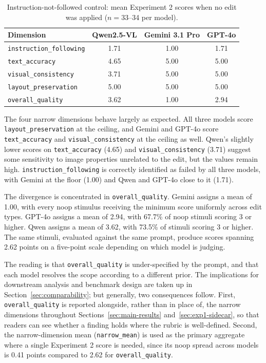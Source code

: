 \begin{table}[htbp]
\centering
\caption{Instruction-not-followed control: mean Experiment 2 scores when no edit was applied ($n = 33$--34 per model).}
\label{tab:noop-control}
\begin{tabular}{lccc}
\toprule
Dimension & Qwen2.5-VL & Gemini 3.1 Pro & GPT-4o \\
\midrule
\texttt{instruction\_following} & 1.71 & 1.00 & 1.71 \\
\texttt{text\_accuracy}         & 4.65 & 5.00 & 5.00 \\
\texttt{visual\_consistency}    & 3.71 & 5.00 & 5.00 \\
\texttt{layout\_preservation}   & 5.00 & 5.00 & 5.00 \\
\texttt{overall\_quality}       & 3.62 & 1.00 & 2.94 \\
\bottomrule
\end{tabular}
\end{table}

The four narrow dimensions behave largely as expected. All three models score \texttt{layout\_preservation} at the ceiling, and Gemini and GPT-4o score \texttt{text\_accuracy} and \texttt{visual\_consistency} at the ceiling as well. Qwen's slightly lower scores on \texttt{text\_accuracy} (4.65) and \texttt{visual\_consistency} (3.71) suggest some sensitivity to image properties unrelated to the edit, but the values remain high. \texttt{instruction\_following} is correctly identified as failed by all three models, with Gemini at the floor (1.00) and Qwen and GPT-4o close to it (1.71).

The divergence is concentrated in \texttt{overall\_quality}. Gemini assigns a mean of 1.00, with every noop stimulus receiving the minimum score uniformly across edit types. GPT-4o assigns a mean of 2.94, with 67.7\% of noop stimuli scoring 3 or higher. Qwen assigns a mean of 3.62, with 73.5\% of stimuli scoring 3 or higher. The same stimuli, evaluated against the same prompt, produce scores spanning 2.62 points on a five-point scale depending on which model is judging.

The reading is that \texttt{overall\_quality} is under-specified by the prompt, and that each model resolves the scope according to a different prior. The implications for downstream analysis and benchmark design are taken up in Section~\ref{sec:comparability}; but generally, two consequences follow. First, \texttt{overall\_quality} is reported alongside, rather than in place of, the narrow dimensions throughout Sections~\ref{sec:main-results} and~\ref{sec:exp1-sidecar}, so that readers can see whether a finding holds where the rubric is well-defined. Second, the narrow-dimension mean (\texttt{narrow\_mean}) is used as the primary aggregate where a single Experiment 2 score is needed, since its noop spread across models is 0.41 points compared to 2.62 for \texttt{overall\_quality}.

